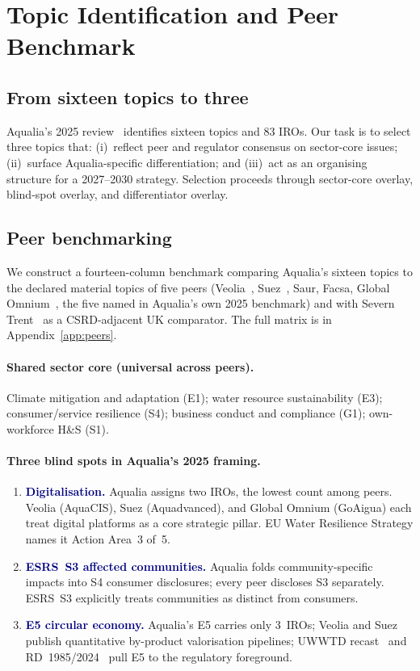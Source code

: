 \documentclass[11pt, a4paper]{article}
\newcommand{\nav}[1]{\textcolor{navy}{\textbf{#1}}}
\begin{document}
\section{Topic Identification and Peer Benchmark}
\label{sec:topics}

\subsection{From sixteen topics to three}

Aqualia's 2025 review~\cite{aqualiaDMReview2025} identifies sixteen topics and 83 IROs. Our task is to select three topics that: (i)~reflect peer and regulator consensus on sector-core issues; (ii)~surface Aqualia-specific differentiation; and (iii)~act as an organising structure for a 2027--2030 strategy. Selection proceeds through sector-core overlay, blind-spot overlay, and differentiator overlay.

\subsection{Peer benchmarking}

We construct a fourteen-column benchmark comparing Aqualia's sixteen topics to the declared material topics of five peers (Veolia~\cite{veolia2024}, Suez~\cite{suez2024}, Saur, Facsa, Global Omnium~\cite{globalomnium2023}, the five named in Aqualia's own 2025 benchmark) and with Severn Trent~\cite{severntrent2024} as a CSRD-adjacent UK comparator. The full matrix is in Appendix~\ref{app:peers}.

\paragraph{Shared sector core (universal across peers).}
Climate mitigation and adaptation (E1); water resource sustainability (E3); consumer/service resilience (S4); business conduct and compliance (G1); own-workforce H\&S (S1).

\paragraph{Three blind spots in Aqualia's 2025 framing.}
\begin{enumerate}
\item \nav{Digitalisation.} Aqualia assigns two IROs, the lowest count among peers. Veolia (AquaCIS), Suez (Aquadvanced), and Global Omnium (GoAigua) each treat digital platforms as a core strategic pillar. EU Water Resilience Strategy names it Action Area~3 of~5.
\item \nav{ESRS~S3 affected communities.} Aqualia folds community-specific impacts into S4 consumer disclosures; every peer discloses S3 separately. ESRS~S3 explicitly treats communities as distinct from consumers.
\item \nav{E5 circular economy.} Aqualia's E5 carries only 3~IROs; Veolia and Suez publish quantitative by-product valorisation pipelines; UWWTD recast~\cite{uwwtd2024} and RD~1985/2024~\cite{rd1985} pull E5 to the regulatory foreground.
\end{enumerate}
\end{document}
